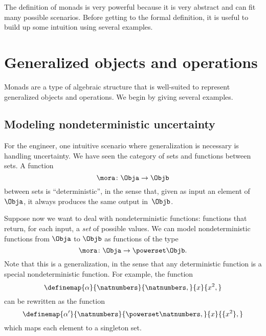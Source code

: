
The definition of monads is very powerful because it is very abstract and can fit many possible scenarios.
Before getting to the formal definition, it is useful to build up some intuition using several examples.

\section{Generalized objects and operations}

Monads are a type of algebraic structure that is well-suited to represent generalized objects and operations.
We begin by giving several examples.

\subsection{Modeling nondeterministic uncertainty}

For the engineer, one intuitive scenario where generalization is necessary is handling uncertainty.
We have seen the category  \Set of sets and functions between sets.
A function
\begin{equation}
    \label{eq:monad-simple}
    \mora\colon\Obja\to\Objb
\end{equation}
between sets is ``deterministic'', in the sense that, given as input an element of~$\Obja$, it always produces the same output in~$\Objb$.

Suppose now we want to deal with nondeterministic functions: functions that return, for each input, a \emph{set} of possible values.
We can model nondeterministic functions from $\Obja$ to $\Objb$ as functions of the type
\begin{equation}
    \label{eq:monad-generalized}
    \mora\colon\Obja\to\powerset\Objb.
\end{equation}
%
Note that this is a generalization, in the sense that any deterministic function is a special nondeterministic function.
For example, the function
%
\begin{equation}
    \label{eq:monad-alpha-example1}
    \definemap{\alpha}{\natnumbers}{\natnumbers,}%
    {x}{x^2,}
\end{equation}
%
can be rewritten as the function
%
\begin{equation}
    \label{eq:monad-alpha-example2}
    \definemap{\alpha'}{\natnumbers}{\powerset\natnumbers,}%
    {x}{\{x^2\},}
\end{equation}
%
which maps each element to a singleton set.

